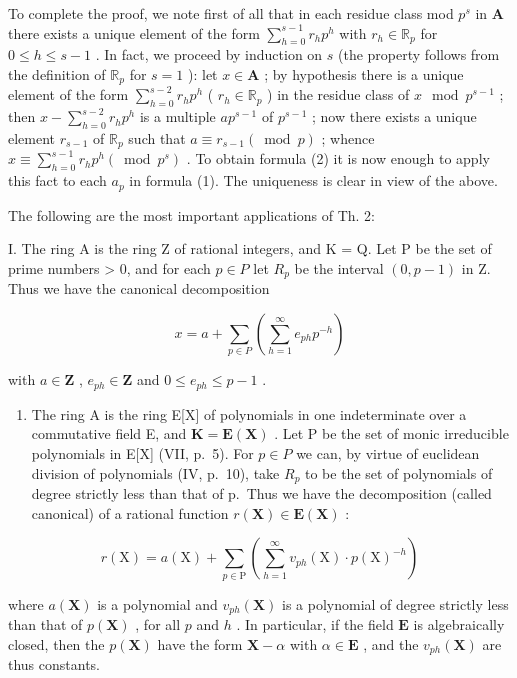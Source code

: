 To complete the proof, we note first of all that in each residue class mod \(p^s\) in \(\mathbf{A}\) there exists a unique element of the form \(\sum_{h=0}^{s-1} r_h p^h\) with \(r_h \in \mathbb{R}_p\) for \(0 \leqslant h \leqslant s-1\) . In fact, we proceed by induction on \(s\) (the property follows from the definition of \(\mathbb{R}_p\) for \(s=1\) ): let \(x \in \mathbf{A}\) ; by hypothesis there is a unique element of the form \(\sum_{h=0}^{s-2} r_h p^h\) ( \(r_h \in \mathbb{R}_p\) ) in the residue class of \(x \mod p^{s-1}\) ; then \(x - \sum_{h=0}^{s-2} r_h p^h\) is a multiple \(ap^{s-1}\) of \(p^{s-1}\) ; now there exists a unique element \(r_{s-1}\) of \(\mathbb{R}_p\) such that \(a \equiv r_{s-1} (\bmod p)\) ; whence \(x \equiv \sum_{h=0}^{s-1} r_h p^h (\bmod p^s)\) . To obtain formula (2) it is now enough to apply this fact to each \(a_p\) in formula (1). The uniqueness is clear in view of the above.

The following are the most important applications of Th. 2:

I. The ring A is the ring Z of rational integers, and K = Q. Let P be the set of prime numbers \textgreater{} 0, and for each \(p \in P\) let \(R_{p}\) be the interval \((0, p - 1)\) in Z. Thus we have the canonical decomposition

\[
x = a + \sum_ {p \in P} \left(\sum_ {h = 1} ^ {\infty} e _ {p h} p ^ {- h}\right)
\]

with \(a \in \mathbf{Z}\) , \(e_{ph} \in \mathbf{Z}\) and \(0 \leqslant e_{ph} \leqslant p - 1\) .

\begin{enumerate}
\def\labelenumi{\Roman{enumi}.}
\setcounter{enumi}{1}
\tightlist
\item
  The ring A is the ring E{[}X{]} of polynomials in one indeterminate over a commutative field E, and \(\mathbf{K} = \mathbf{E}(\mathbf{X})\) . Let P be the set of monic irreducible polynomials in E{[}X{]} (VII, p.~5). For \(p \in P\) we can, by virtue of euclidean division of polynomials (IV, p.~10), take \(R_{p}\) to be the set of polynomials of degree strictly less than that of p.~Thus we have the decomposition (called canonical) of a rational function \(r(\mathbf{X}) \in \mathbf{E}(\mathbf{X})\) :
\end{enumerate}

\[
r (\mathrm{X}) = a (\mathrm{X}) + \sum_ {p \in \mathrm{P}} \left(\sum_ {h = 1} ^ {\infty} v _ {p h} (\mathrm{X}) \cdot p (\mathrm{X}) ^ {- h}\right)
\]

where \(a(\mathbf{X})\) is a polynomial and \(v_{ph}(\mathbf{X})\) is a polynomial of degree strictly less than that of \(p(\mathbf{X})\) , for all \(p\) and \(h\) . In particular, if the field \(\mathbf{E}\) is algebraically closed, then the \(p(\mathbf{X})\) have the form \(\mathbf{X} - \alpha\) with \(\alpha \in \mathbf{E}\) , and the \(v_{ph}(\mathbf{X})\) are thus constants.

